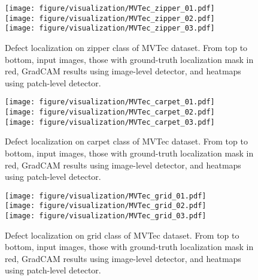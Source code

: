 \documentclass[final]{cvpr}
\begin{document}
\begin{figure}
    \centering
    \texttt{[image: figure/visualization/MVTec\_zipper\_01.pdf]}\\
    \vspace{0.05in}
    \texttt{[image: figure/visualization/MVTec\_zipper\_02.pdf]}\\
    \vspace{0.05in}
    \texttt{[image: figure/visualization/MVTec\_zipper\_03.pdf]}
    \caption{Defect localization on zipper class of MVTec dataset. From top to bottom, input images, those with ground-truth localization mask in red, GradCAM results using image-level detector, and heatmaps using patch-level detector.}
    \label{fig:heatmap_zipper}
\end{figure}

\begin{figure}
    \centering
    \texttt{[image: figure/visualization/MVTec\_carpet\_01.pdf]}\\
    \vspace{0.05in}
    \texttt{[image: figure/visualization/MVTec\_carpet\_02.pdf]}\\
    \vspace{0.05in}
    \texttt{[image: figure/visualization/MVTec\_carpet\_03.pdf]}
    \caption{Defect localization on carpet class of MVTec dataset. From top to bottom, input images, those with ground-truth localization mask in red, GradCAM results using image-level detector, and heatmaps using patch-level detector.}
    \label{fig:heatmap_carpet}
\end{figure}

\begin{figure}
    \centering
    \texttt{[image: figure/visualization/MVTec\_grid\_01.pdf]}\\
    \vspace{0.05in}
    \texttt{[image: figure/visualization/MVTec\_grid\_02.pdf]}\\
    \vspace{0.05in}
    \texttt{[image: figure/visualization/MVTec\_grid\_03.pdf]}
    \caption{Defect localization on grid class of MVTec dataset. From top to bottom, input images, those with ground-truth localization mask in red, GradCAM results using image-level detector, and heatmaps using patch-level detector.}
    \label{fig:heatmap_grid}
\end{figure}
\end{document}
